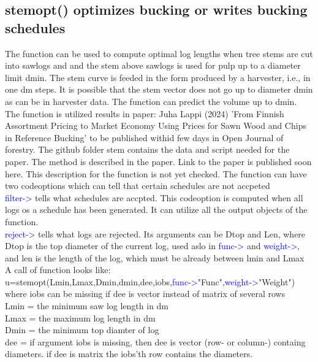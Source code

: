 \subsection{\textcolor{VioletRed}{stemopt}() optimizes bucking or writes bucking schedules} 
\label{stemopt} 
The function can be used to compute optimal log lengths when tree stems are cut into sawlogs and 
and the stem above sawlogs is used for pulp up to a diameter limit dmin. 
The stem curve is feeded 
in the form produced by a harvester, i.e., in one dm steps. It is possible that 
the stem vector does not go up to diameter dmin as can be in harvester data. The function can predict 
the volume up to dmin. The function is utilized results in paper: Juha Lappi (2024) 'From Finnish Assortment Pricing to Market 
Economy Using Prices for Sawn Wood and 
Chips in Reference Bucking' to be  published withid few days in Open Journal of forestry. 
The github folder stem contains the data and script needed for the paper. The method is described 
in the paper. Link to the paper is published soon here. This description for the function is not 
yet checked. 
The function can have two codeoptions which can tell that certain schedules are not accpeted\\ 
\textcolor{blue}{filter->} tells what schedules are accpted. This codeoption is computed when all logs os a schedule 
has been generated. It can utilize all the output objects of the function.\\ 
\textcolor{blue}{reject->} tells what logs are rejected. Its arguments can be Dtop and Len, where Dtop is the 
top diameter of the current log, used aslo in \textcolor{blue}{func->} and \textcolor{blue}{weight->}, and len is the length of the 
log, which must be already between lmin and Lmax\\ 
A call of function looks like:\\ 
u=\textcolor{VioletRed}{stemopt}(Lmin,Lmax,Dmin,dmin,dee,iobs,\textcolor{blue}{func->}"Func",\textcolor{blue}{weight->}"Weight")\\ 
where iobs can be missing if dee is vector instead of matrix of several rows\\ 
Lmin = the minimum saw log length in dm\\ 
Lmax = the maximum log length in dm\\ 
Dmin = the minimum top diamter of log\\ 
dee = if argument iobs is missing, then dee is vector (row- or column-) containg diameters. 
if dee is matrix the iobs'th row contains the diameters.\\ 
